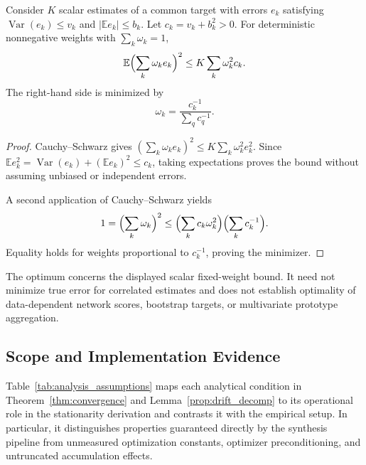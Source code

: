 \begin{lemma}
\label{lem:reliability}
Consider $K$ scalar estimates of a common target with errors $e_k$ satisfying
$\operatorname{Var}(e_k)\le v_k$ and
$|\mathbb E e_k|\le b_k$.
Let $c_k=v_k+b_k^2>0$.
For deterministic nonnegative weights with $\sum_k\omega_k=1$,
\begin{equation}
 \mathbb E\Bigl(\sum_k\omega_ke_k\Bigr)^2
 \le K\sum_k\omega_k^2c_k.
 \label{eq:supp_reliability_bound}
\end{equation}
The right-hand side is minimized by
\begin{equation}
 \omega_k=\frac{c_k^{-1}}{\sum_qc_q^{-1}}.
\end{equation}
\end{lemma}
\begin{proof}
Cauchy--Schwarz gives
$(\sum_k\omega_ke_k)^2\le K\sum_k\omega_k^2e_k^2$.
Since $\mathbb E e_k^2=\operatorname{Var}(e_k)+(\mathbb E e_k)^2\le c_k$, taking expectations proves the bound without assuming unbiased or independent errors.

A second application of Cauchy--Schwarz yields
\begin{equation*}
 1=\Bigl(\sum_k\omega_k\Bigr)^2
 \le\Bigl(\sum_kc_k\omega_k^2\Bigr)
       \Bigl(\sum_kc_k^{-1}\Bigr).
\end{equation*}
Equality holds for weights proportional to $c_k^{-1}$, proving the minimizer.
\end{proof}
The optimum concerns the displayed scalar fixed-weight bound. It need not minimize true error for correlated estimates and does not establish optimality of data-dependent network scores, bootstrap targets, or multivariate prototype aggregation.

\subsection{Scope and Implementation Evidence}

Table~\ref{tab:analysis_assumptions} maps each analytical condition in Theorem~\ref{thm:convergence} and Lemma~\ref{prop:drift_decomp} to its operational role in the stationarity derivation and contrasts it with the empirical setup. In particular, it distinguishes properties guaranteed directly by the synthesis pipeline from unmeasured optimization constants, optimizer preconditioning, and untruncated accumulation effects.

